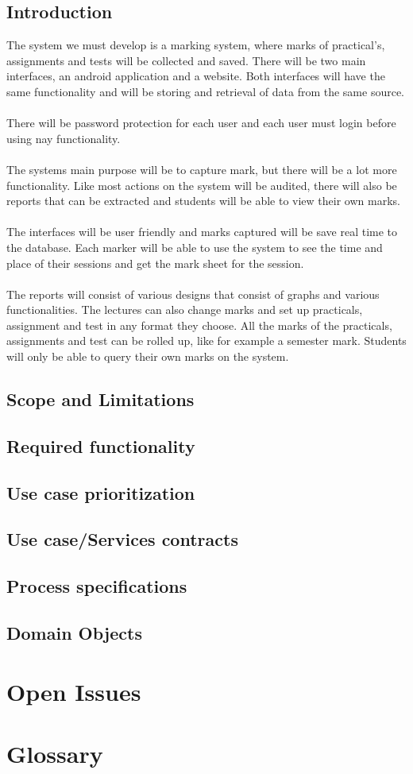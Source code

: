 \documentclass[10pt,a4paper]{article}
\begin{document}
\subsection{Introduction}
The system we must develop is a marking system, where marks of practical’s, assignments and tests will be collected and saved. There will be two main interfaces, an android application and a website. Both interfaces will have the same functionality and will be storing and retrieval of data from the same source.\\\\
There will be password protection for each user and each user must login before using nay functionality.\\\\
The systems main purpose will be to capture mark, but there will be a lot more functionality. Like most actions on the system will be audited, there will also be reports that can be extracted and students will be able to view their own marks.\\\\
The interfaces will be user friendly and marks captured will be save real time to the database. Each marker will be able to use the system to see the time and place of their sessions and get the mark sheet for the session.\\\\ 
The reports will consist of various designs that consist of graphs and various functionalities. The lectures can also change marks and set up practicals, assignment and test in any format they choose. All the marks of the practicals, assignments and test can be rolled up, like for example a semester mark. Students will only be able to query their own marks on the system. 

\subsection{Scope and Limitations}
\subsection{Required functionality}
\subsection{Use case prioritization}
\subsection{Use case/Services contracts}
\subsection{Process specifications}
\subsection{Domain Objects}

\section{Open Issues}
\section{Glossary}
\end{document}
